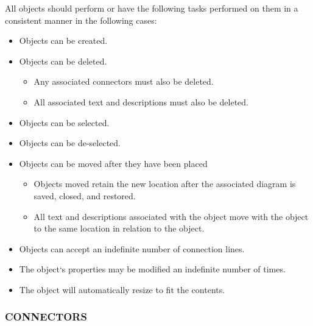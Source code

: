 \documentclass[twoside,letterpaper]{article}
\begin{document}
{All objects should perform or have the following tasks performed on them in a consistent manner in the following cases: 
\begin{itemize}
	\item Objects can be created.
	\item Objects can be deleted.
\begin{itemize}
\item Any associated connectors must also be deleted.
\item All associated text and descriptions must also be deleted.
\end{itemize}
	\item Objects can be selected.
	\item Objects can be de-selected.
	\item Objects can be moved after they have been placed
\begin{itemize}
\item Objects moved retain the new location after the associated diagram is saved, closed, and restored.
\item All text and descriptions associated with the object move with the object to the same location in relation to the object.
\end{itemize}
\item Objects can accept an indefinite number of connection lines.
\item The object`s properties may be modified an indefinite number of times.
\item The object will automatically resize to fit the contents.
\end{itemize}

\bigskip

\subsubsection[CONNECTORS]{\bfseries CONNECTORS}

}
\end{document}
